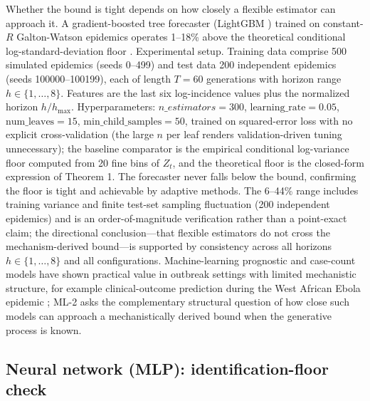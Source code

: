 \documentclass[review]{elsarticle}
\theoremstyle{plain}
\theoremstyle{definition}
\begin{document}
Whether the bound is tight depends on how closely a flexible estimator can approach it. A gradient-boosted tree forecaster (LightGBM \citep{ke2017lightgbm}) trained on constant-$R$ Galton-Watson epidemics operates 1--18\% above the theoretical conditional log-standard-deviation floor . Experimental setup. Training data comprise 500 simulated epidemics (seeds 0--499) and test data 200 independent epidemics (seeds 100000--100199), each of length $T = 60$ generations with horizon range $h \in \{1, \dots, 8\}$. Features are the last six log-incidence values plus the normalized horizon $h/h_{\max}$. Hyperparameters: $n\_estimators = 300$, $\text{learning\_rate} = 0.05$, $\text{num\_leaves} = 15$, $\text{min\_child\_samples} = 50$, trained on squared-error loss with no explicit cross-validation (the large $n$ per leaf renders validation-driven tuning unnecessary); the baseline comparator is the empirical conditional log-variance floor computed from 20 fine bins of $Z_t$, and the theoretical floor is the closed-form expression of Theorem 1. The forecaster never falls below the bound, confirming the floor is tight and achievable by adaptive methods. The 6--44\% range includes training variance and finite test-set sampling fluctuation (200 independent epidemics) and is an order-of-magnitude verification rather than a point-exact claim; the directional conclusion---that flexible estimators do not cross the mechanism-derived bound---is supported by consistency across all horizons $h \in \{1, \dots, 8\}$ and all configurations. Machine-learning prognostic and case-count models have shown practical value in outbreak settings with limited mechanistic structure, for example clinical-outcome prediction during the West African Ebola epidemic \citep{colubri2019machine}; ML-2 asks the complementary structural question of how close such models can approach a mechanistically derived bound when the generative process is known.

\subsection{Neural network (MLP): identification-floor check}
\end{document}
